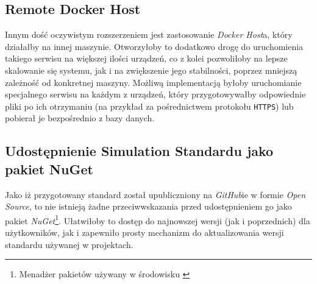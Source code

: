 \subsection{Remote Docker Host}

\par Innym dość oczywistym rozszerzeniem jest zastosowanie \emph{Docker Host}a, który działałby na innej maszynie. Otworzyłoby to dodatkowo drogę do uruchomienia takiego serwisu na większej ilości urządzeń, co z kolei pozwoliłoby na lepsze skalowanie się systemu, jak i na zwiększenie jego stabilności, poprzez mniejszą zależność od konkretnej maszyny. Możliwą implementacją byłoby uruchomianie specjalnego serwisu na każdym z urządzeń, który przygotowywałby odpowiednie pliki po ich otrzymaniu (na przykład za pośrednictwem protokołu \texttt{HTTPS}) lub pobierał je bezpośrednio z bazy danych.

\subsection{Udostępnienie Simulation Standardu jako pakiet NuGet}

\par Jako iż przygotowany standard został upubliczniony na \emph{GitHub}ie w formie \emph{Open Source}, to nie istnieją żadne przeciwwskazania przed udostępnieniem go jako pakiet \emph{NuGet}\footnote{Menadżer pakietów używany w środowisku \emph{\dotnet{}}}. Ułatwiłoby to dostęp do najnowszej wersji (jak i poprzednich) dla użytkowników, jak i zapewniło prosty mechanizm do aktualizowania wersji standardu używanej w projektach.
